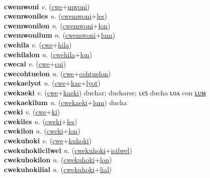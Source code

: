  \label{cwemiclolon} \\
\textbf{cwemwoni} \textit{v.} (\hyperref[cwe]{cwe}+\hyperref[mwoni]{mwoni})
 \label{cwemwoni} \\
\textbf{cwemwoniles} \textit{n.} (\hyperref[cwemwoni]{cwemwoni}+\hyperref[les]{les})
 \label{cwemwoniles} \\
\textbf{cwemwonilon} \textit{n.} (\hyperref[cwemwoni]{cwemwoni}+\hyperref[lon]{lon})
 \label{cwemwonilon} \\
\textbf{cwemwonilum} \textit{n.} (\hyperref[cwemwoni]{cwemwoni}+\hyperref[lum]{lum})
 \label{cwemwonilum} \\
\textbf{cwehila} \textit{v.} (\hyperref[cwe]{cwe}+\hyperref[hila]{hila})
 \label{cwehila} \\
\textbf{cwehilalon} \textit{n.} (\hyperref[cwehila]{cwehila}+\hyperref[lon]{lon})
 \label{cwehilalon} \\
\textbf{cwecai} \textit{v.} (\hyperref[cwe]{cwe}+\hyperref[cai]{cai})
 \label{cwecai} \\
\textbf{cwecohtuelon} \textit{n.} (\hyperref[cwe]{cwe}+\hyperref[cohtuelon]{cohtuelon})
 \label{cwecohtuelon} \\
\textbf{cwekaelyot} \textit{n.} (\hyperref[cwe]{cwe}+\hyperref[kae]{kae}+\hyperref[lyot]{lyot})
 \label{cwekaelyot} \\
\textbf{cwekaeki} \textit{v.} (\hyperref[cwe]{cwe}+\hyperref[kaeki]{kaeki})
duchar; ducharse; ʟєꜱ ducha ʟᴏᴧ con \hyperref[cwekaekilum]{ʟᴜᴍ} \label{cwekaeki} \\
\textbf{cwekaekilum} \textit{n.} (\hyperref[cwekaeki]{cwekaeki}+\hyperref[lum]{lum})
ducha \label{cwekaekilum} \\
\textbf{cweki} \textit{v.} (\hyperref[cwe]{cwe}+\hyperref[ki]{ki})
 \label{cweki} \\
\textbf{cwekiles} \textit{n.} (\hyperref[cweki]{cweki}+\hyperref[les]{les})
 \label{cwekiles} \\
\textbf{cwekilon} \textit{n.} (\hyperref[cweki]{cweki}+\hyperref[lon]{lon})
 \label{cwekilon} \\
\textbf{cwekuhoki} \textit{v.} (\hyperref[cwe]{cwe}+\hyperref[kuhoki]{kuhoki})
 \label{cwekuhoki} \\
\textbf{cwekuhokiicilwel} \textit{n.} (\hyperref[cwekuhoki]{cwekuhoki}+\hyperref[icilwel]{icilwel})
 \label{cwekuhokiicilwel} \\
\textbf{cwekuhokilon} \textit{n.} (\hyperref[cwekuhoki]{cwekuhoki}+\hyperref[lon]{lon})
 \label{cwekuhokilon} \\
\textbf{cwekuhokilial} \textit{n.} (\hyperref[cwekuhoki]{cwekuhoki}+\hyperref[lial]{lial})
